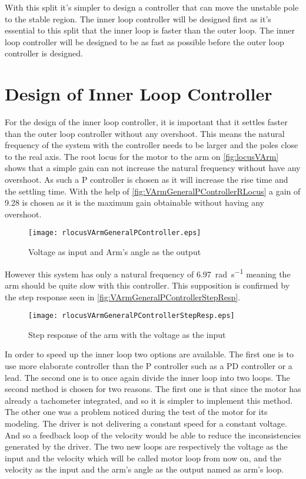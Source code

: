 With this split it's simpler to design a controller that can move the unstable pole to the stable region. The inner loop controller will be designed first as it's essential to this split that the inner loop is faster than the outer loop. The inner loop controller will be designed to be as fast as possible before the outer loop controller is designed.

\section{Design of Inner Loop Controller}

For the design of the inner loop controller, it is important that it settles faster than the outer loop controller without any overshoot. This means the natural frequency of the system with the controller needs to be larger and the poles close to the real axis. The root locus for the motor to the arm on \autoref{fig:locusVArm} shows that a simple gain can not increase the natural frequency without have any overshoot. As such a P controller is chosen as it will increase the rise time and the settling time. With the help of \autoref{fig:VArmGeneralPControllerRLocus} a gain of 9.28 is chosen as it is the maximum gain obtainable without having any overshoot.

\begin{figure} [htbp] 
	\centering
	\texttt{[image: rlocusVArmGeneralPController.eps]}
	\caption{Voltage as input and Arm's angle as the output}
	\label{fig:VArmGeneralPControllerRLocus}
\end{figure}

However this system has only a natural frequency of \SI{6.97}{\radian\per\second} meaning the arm should be quite slow with this controller. This supposition is confirmed by the step response seen in \autoref{fig:VArmGeneralPControllerStepResp}.

\begin{figure} [htbp] 
	\centering
	\texttt{[image: rlocusVArmGeneralPControllerStepResp.eps]}
	\caption{Step response of the arm with the voltage as the input}
	\label{fig:VArmGeneralPControllerStepResp}
\end{figure}

In order to speed up the inner loop two options are available. The first one is to use more elaborate controller than the P controller such as a PD controller or a lead. The second one is to once again divide the inner loop into two loops. The second method is chosen for two reasons. The first one is that since the motor has already a tachometer integrated, and so it is simpler to implement this method. The other one was a problem noticed during the test of the motor for its modeling. The driver is not delivering a constant speed for a constant voltage. And so a feedback loop of the velocity would be able to reduce the inconsistencies generated by the driver. The two new loops are respectively the voltage as the input and the velocity which will be called motor loop from now on, and the velocity as the input and the arm's angle as the output named as arm's loop.

